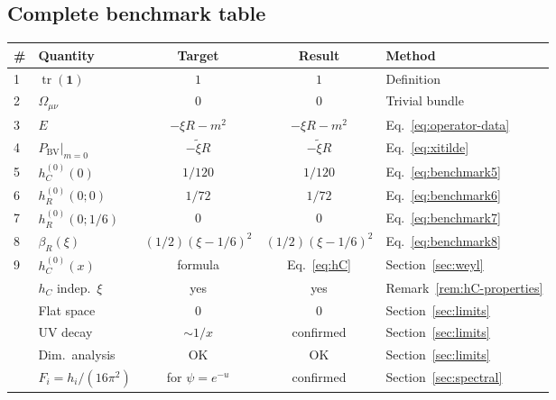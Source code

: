 \documentclass[11pt,a4paper]{article}
\newcommand{\Id}{\mathbf{1}}
\newcommand{\tr}{\operatorname{tr}}
\newcommand{\xitilde}{\tilde{\xi}}
\theoremstyle{definition}
\theoremstyle{remark}
\begin{document}
\subsection{Complete benchmark table}

\begin{center}
\renewcommand{\arraystretch}{1.3}
\begin{tabular}{llccl}
\toprule
\textbf{\#} & \textbf{Quantity} & \textbf{Target} & \textbf{Result} & \textbf{Method} \\
\midrule
1 & $\tr(\Id)$ & $1$ & $1$ & Definition \\
2 & $\Omega_{\mu\nu}$ & $0$ & $0$ & Trivial bundle \\
3 & $E$ & $-\xi R - m^2$ & $-\xi R - m^2$ & Eq.~\eqref{eq:operator-data} \\
4 & $P_{\text{BV}}|_{m=0}$ & $-\xitilde R$ & $-\xitilde R$ & Eq.~\eqref{eq:xitilde} \\
5 & $h_C^{(0)}(0)$ & $1/120$ & $1/120$ & Eq.~\eqref{eq:benchmark5} \\
6 & $h_R^{(0)}(0;0)$ & $1/72$ & $1/72$ & Eq.~\eqref{eq:benchmark6} \\
7 & $h_R^{(0)}(0;1/6)$ & $0$ & $0$ & Eq.~\eqref{eq:benchmark7} \\
8 & $\beta_R(\xi)$ & $(1/2)(\xi-1/6)^2$ & $(1/2)(\xi-1/6)^2$ & Eq.~\eqref{eq:benchmark8} \\
9 & $h_C^{(0)}(x)$ & formula & Eq.~\eqref{eq:hC} & Section~\ref{sec:weyl} \\
& $h_C$ indep.\ $\xi$ & yes & yes & Remark~\ref{rem:hC-properties} \\
& Flat space & $0$ & $0$ & Section~\ref{sec:limits} \\
& UV decay & $\sim 1/x$ & confirmed & Section~\ref{sec:limits} \\
& Dim.\ analysis & OK & OK & Section~\ref{sec:limits} \\
& $F_i = h_i/(16\pi^2)$ & for $\psi=e^{-u}$ & confirmed & Section~\ref{sec:spectral} \\
\bottomrule
\end{tabular}
\end{center}
\end{document}

